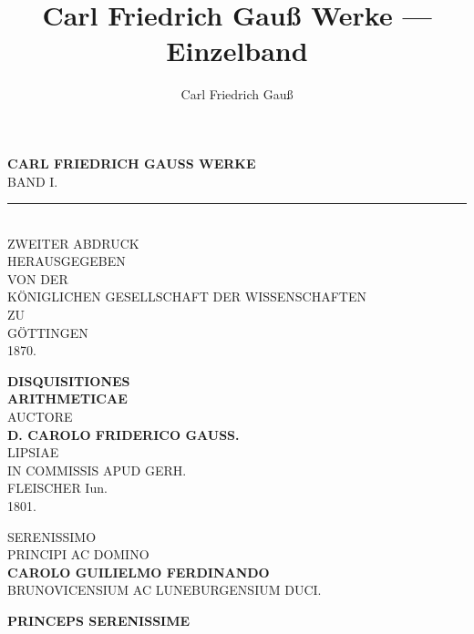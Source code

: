 \documentclass[12pt,a4paper]{article}
\title{Carl Friedrich Gau\ss{} Werke --- Einzelband}
\author{Carl Friedrich Gau\ss{}}
\date{}
\theoremstyle{plain}
\theoremstyle{definition}
\theoremstyle{remark}
\begin{document}
\maketitle

\thispagestyle{empty}
\begin{center}
\vspace*{3cm}
{\Huge\bfseries CARL FRIEDRICH GAUSS WERKE}\\[1cm]
{\LARGE BAND I.}\\[2cm]
\rule{0.5\textwidth}{0.5pt}\\[2cm]
{\Large ZWEITER ABDRUCK}\\[0.5cm]
{\large HERAUSGEGEBEN}\\[0.3cm]
{\large VON DER}\\[0.3cm]
{\large K\"ONIGLICHEN GESELLSCHAFT DER WISSENSCHAFTEN}\\[0.3cm]
{\large ZU}\\[0.5cm]
{\LARGE G\"OTTINGEN}\\[0.5cm]
{\large 1870.}
\end{center}
\clearpage

\thispagestyle{empty}
\begin{center}
\vspace*{2cm}
{\LARGE\bfseries DISQUISITIONES}\\[0.5cm]
{\LARGE\bfseries ARITHMETICAE}\\[1cm]
{\large AUCTORE}\\[0.5cm]
{\large\bfseries D. CAROLO FRIDERICO GAUSS.}\\[2cm]
{\large LIPSIAE}\\[0.3cm]
{\large IN COMMISSIS APUD GERH.}\\[0.3cm]
{\large FLEISCHER Iun.}\\[0.5cm]
{\large 1801.}
\end{center}
\clearpage

\thispagestyle{empty}
\begin{center}
{\large SERENISSIMO}\\[0.3cm]
{\large PRINCIPI AC DOMINO}\\[0.5cm]
{\Large\bfseries CAROLO GUILIELMO FERDINANDO}\\[0.3cm]
{\large BRUNOVICENSIUM AC LUNEBURGENSIUM DUCI.}
\end{center}

\vspace{0.5cm}
\begin{center}
{\large\bfseries PRINCEPS SERENISSIME}
\end{center}
\end{document}

